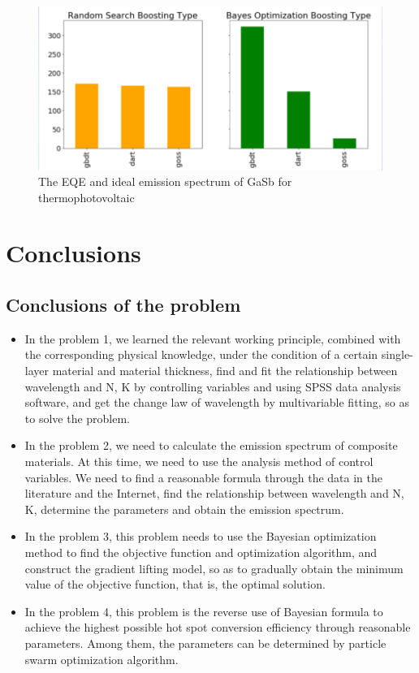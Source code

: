 \documentclass{apmcmthesis}
\begin{document}
\begin{itemize}
\begin{itemize}
\begin{itemize}
\begin{figure}[ht]
\includegraphics[scale=0.4]{figures/8.png}
\caption{The EQE and ideal emission spectrum of GaSb for thermophotovoltaic}
\label{fig:pathdemo}
\end{figure}

\end{itemize}
\end{itemize}
\end{itemize}

\newpage
\section{Conclusions}
\subsection{Conclusions of the problem}
\begin{itemize}
\item In the problem 1, we learned the relevant working principle, combined with the corresponding physical knowledge, under the condition of a certain single-layer material and material thickness, find and fit the relationship between wavelength and N, K by controlling variables and using SPSS data analysis software, and get the change law of wavelength by multivariable fitting, so as to solve the problem.
\item In the problem 2, we need to calculate the emission spectrum of composite materials. At this time, we need to use the analysis method of control variables. We need to find a reasonable formula through the data in the literature and the Internet, find the relationship between wavelength and N, K, determine the parameters and obtain the emission spectrum.
\item In the problem 3, this problem needs to use the Bayesian optimization method to find the objective function and optimization algorithm, and construct the gradient lifting model, so as to gradually obtain the minimum value of the objective function, that is, the optimal solution.
\item In the problem 4, this problem is the reverse use of Bayesian formula to achieve the highest possible hot spot conversion efficiency through reasonable parameters. Among them, the parameters can be determined by particle swarm optimization algorithm.
\end{itemize}	
\end{document}
